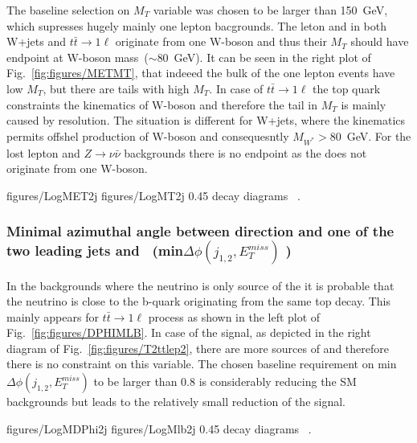 The baseline selection on  $M_{T}$ variable was chosen to be  larger than 150~GeV, which supresses hugely mainly one lepton bacgrounds. The leton and \MET in both  W+jets and $t \bar{t} \to 1\ell$ originate from one W-boson and thus their $M_{T}$ should have endpoint at W-boson mass~($\sim$80~GeV). It can be seen in the right plot of Fig.~\ref{fig:figures/METMT}, that indeeed the bulk of the one lepton events have low $M_{T}$, but there are tails with high $M_{T}$. In case of $t \bar{t} \to 1\ell$ the top quark constraints the kinematics of W-boson and therefore the tail in $M_{T}$  is mainly caused by \MET resolution. The situation is different for W+jets, where the kinematics permits offshel production of W-boson and consequesntly $M_{W^{*}}> 80$~GeV. For the lost lepton and $Z \to \nu \bar{\nu}$ backgrounds there is no endpoint as the \MET does not originate from one W-boson.

                 {figures/LogMET2j} %
                 {figures/LogMT2j} %
                 {0.45}       %
                 { decay diagrams ~\cite{website:stopSupp}. }

\subsubsection{Minimal azimuthal angle between direction and  one of the two leading jets and \MET~(min$\Delta \phi (j_{1,2}, E_{T}^{miss})$ )}

In the backgrounds where the neutrino is only source of the \MET it is probable that the neutrino is close to the b-quark  originating from the same top decay. This mainly appears for $t\bar{t} \to 1\ell$ process as shown in the left plot of Fig.~\ref{fig:figures/DPHIMLB}. In case of the signal, as depicted in the right diagram of Fig.~\ref{fig:figures/T2ttlep2}, there are more sources of \MET and therefore there is no constraint on this variable. The chosen baseline requirement on min$\Delta \phi (j_{1,2}, E_{T}^{miss})$ to be larger than 0.8 is considerably reducing the SM backgrounds but leads to the relatively small reduction of the signal.

                 {figures/LogMDPhi2j} %
                 {figures/LogMlb2j} %
                 {0.45}       %
                 { decay diagrams ~\cite{website:stopSupp}. }

